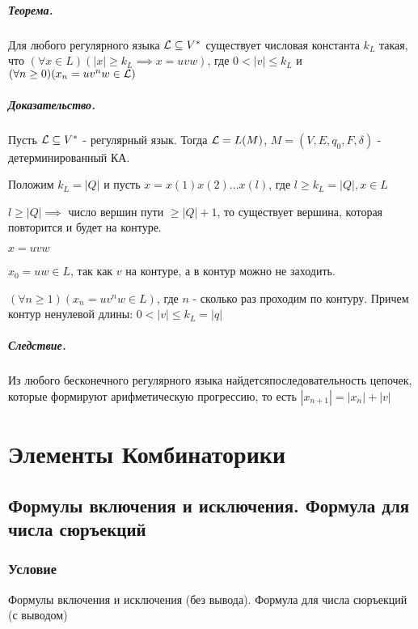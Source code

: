 \documentclass{report}
\begin{document}
\paragraph*{Теорема.}
Для любого регулярного языка $ {\cal L} \subseteq V^{*}$ существует числовая константа
$k_{L}$ такая, что $(\forall x \in L)(|x| \ge k_{L} \implies x = uvw)$, где
$0 <  |v| \le k_{L}$ и $(\forall n \ge 0)(x_{n}=uv^{n}w \in {\cal L})$ 

\paragraph*{Доказательство.}
Пусть $ {\cal L} \subseteq V^{*}$ - регулярный язык. Тогда $ {\cal L} = L(M)$,
$M = (V, E, q_0,F,\delta)$ - детерминированный КА.

Положим $k_{L} = |Q|$ и пусть $x = x(1)x(2)\ldots x(l)$,\newline
где $l \ge k_{L} = |Q|, x \in L$

\medskip

$l \ge |Q| \implies$ число вершин пути $\ge |Q| + 1$, то существует вершина, которая
повторится и будет на контуре.

$x = uvw$

 $x_0=uw \in L$, так как $v$ на контуре, а в контур можно не заходить.

\medskip

$(\forall n \ge 1)(x_{n}=uv^{n}w \in L)$, где $n$ - сколько раз проходим по контуру.
Причем контур ненулевой длины:  $0 < |v| \le  k_{L} = |q|$

\paragraph*{Следствие.}
Из любого бесконечного регулярного языка найдется\newline последовательность цепочек, которые формируют
арифметическую прогрессию, то есть $|x_{n+1}| = |x_{n}| + |v|$ 

\newpage

\chapter{Элементы Комбинаторики}
\section{Формулы включения и исключения. Формула для числа сюръекций}
\subsection{Условие}
Формулы включения и исключения (без вывода). Формула для числа сюръекций (с
выводом)
\end{document}
